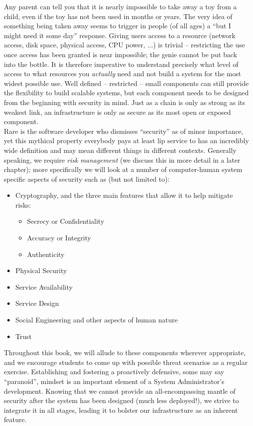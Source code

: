 Any parent can tell you that it is nearly impossible
to take away a toy from a child, even if the toy has
not been used in months or years.  The very idea of
something being taken away seems to trigger in people
(of all ages) a ``but I might need it some day''
response.  Giving users access to a resource (network
access, disk space, physical access, CPU power, ...)
is trivial -- restricting the use once access has been
granted is near impossible; the genie cannot be put
back into the bottle.  It is therefore imperative to
understand precisely what level of access to what
resources you {\em actually} need and not build a
system for the most widest possible use.  Well defined
-- restricted -- small components can still provide
the flexibility to build scalable systems, but each
component needs to be designed from the beginning with
security in mind.  Just as a chain is only as strong
as its weakest link, an infrastructure is only as
secure as its most open or exposed component.  \\

Rare is the software developer who dismisses
``security'' as of minor importance, yet this mythical
property everybody pays at least lip service to has an
incredibly wide definition and may mean different
things in different contexts.  Generally speaking, we
require {\em risk management} (we discuss this in more
detail in a later chapter); more specifically we will
look at a number of computer-human system specific
aspects of security such as (but not limited to):

\begin{itemize}
	\item Cryptography, and the three main features that allow
		it to help mitigate risks:
		\begin{itemize}
			\item Secrecy or Confidentiality
			\item Accuracy or Integrity
			\item Authenticity
		\end{itemize}
	\item Physical Security
	\item Service Availability
	\item Service Design
	\item Social Engineering and other aspects of human nature
	\item Trust
\end{itemize}

Throughout this book, we will allude to these
components wherever appropriate, and we encourage
students to come up with possible threat scenarios as
a regular exercise.  Establishing and fostering a
proactively defensive, some may say ``paranoid'',
mindset is an important element of a System
Administrator's development.  Knowing that we cannot
provide an all-encompassing mantle of security after
the system has been designed (much less deployed!), we
strive to integrate it in all stages, leading it to
bolster our infrastructure as an inherent feature.



